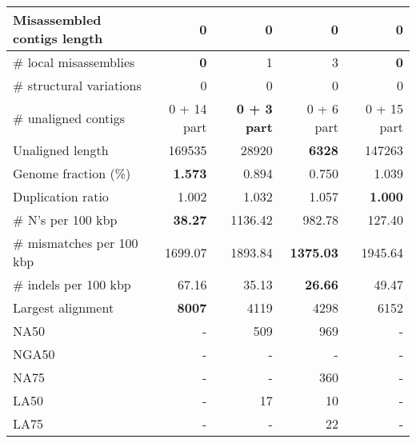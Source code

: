 \documentclass[12pt,a4paper]{article}
\begin{document}
\begin{table}[ht]
\begin{center}
\begin{tabular}{|l*{4}{|r}|}
Misassembled contigs length & 0 & 0 & 0 & 0 \\ \hline
\# local misassemblies & {\bf 0} & 1 & 3 & {\bf 0} \\ \hline
\# structural variations & 0 & 0 & 0 & 0 \\ \hline
\# unaligned contigs & 0 + 14 part & {\bf 0 + 3 part} & 0 + 6 part & 0 + 15 part \\ \hline
Unaligned length & 169535 & 28920 & {\bf 6328} & 147263 \\ \hline
Genome fraction (\%) & {\bf 1.573} & 0.894 & 0.750 & 1.039 \\ \hline
Duplication ratio & 1.002 & 1.032 & 1.057 & {\bf 1.000} \\ \hline
\# N's per 100 kbp & {\bf 38.27} & 1136.42 & 982.78 & 127.40 \\ \hline
\# mismatches per 100 kbp & 1699.07 & 1893.84 & {\bf 1375.03} & 1945.64 \\ \hline
\# indels per 100 kbp & 67.16 & 35.13 & {\bf 26.66} & 49.47 \\ \hline
Largest alignment & {\bf 8007} & 4119 & 4298 & 6152 \\ \hline
NA50 & - & 509 & 969 & - \\ \hline
NGA50 & - & - & - & - \\ \hline
NA75 & - & - & 360 & - \\ \hline
LA50 & - & 17 & 10 & - \\ \hline
LA75 & - & - & 22 & - \\ \hline
\end{tabular}
\end{center}
\end{table}
\end{document}
